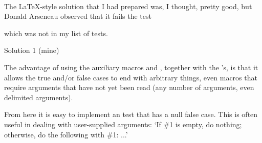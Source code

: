 \\

The LaTeX-style solution that I had prepared was, I thought, pretty
good, but Donald Arseneau 
observed that it fails the test
\begin{lcode}
\test{{\iftrue a\else b\fi}}
\end{lcode}
which was not in my list of tests.

\begin{solution}{Solution 1 (mine)}
\end{solution}

The advantage of using the auxiliary macros \cmd{\@first} and \cmd{\@second},
together with the \cmd{\expandafter}'s, is that it allows the true and/or
false cases to end with arbitrary things, even macros that require
arguments that have not yet been read (any number of arguments, even
delimited arguments).

From here it is easy to implement an  test that has a
null false case. This is often useful in dealing with user-supplied
arguments: `If \#1 is empty, do nothing; otherwise, do the following
with \#1: ...'
\begin{lcode}
\long{}
\end{lcode}



